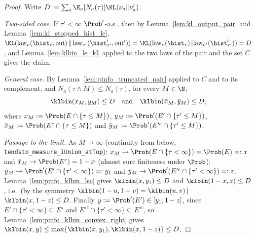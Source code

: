 \begin{proof}
\leanok
Write $D := \sum_a\E_\nu[N_a(\tau)]\KL(\nu_a\|\nu'_a)$.

\emph{Two-sided case.} If $\tau' < \infty$ $\Prob'$-a.s., then by Lemma~\ref{lem:kl_output_pair}
and Lemma~\ref{lem:kl_stopped_hist_le},
$\KL(\mathrm{law}_\nu(\hist_\tau,\mathrm{out})\,\|\,\mathrm{law}_{\nu'}(\hist'_{\tau'},\mathrm{out}'))
= \KL(\mathrm{law}_\nu(\hist_\tau)\|\mathrm{law}_{\nu'}(\hist'_{\tau'})) = D$, and
Lemma~\ref{lem:klbin_le_kl} applied to the two laws of the pair and the set $C$ gives the claim.

\emph{General case.} By Lemma~\ref{lem:pinfo_truncated_pair} applied to $C$ and to its
complement, and $N_a(\tau\wedge M) \le N_a(\tau)$, for every $M \in \N$,
\[
  \klbin(x_M, y_M) \le D \quad\text{and}\quad \klbin(\bar x_M, \bar y_M) \le D,
\]
where $x_M := \Prob(E \cap \{\tau \le M\})$, $y_M := \Prob'(E' \cap \{\tau' \le M\})$,
$\bar x_M := \Prob(E^c \cap \{\tau\le M\})$ and $\bar y_M := \Prob'(E'^c \cap \{\tau'\le M\})$.

\emph{Passage to the limit.} As $M \to \infty$ (continuity from below,
\texttt{tendsto\_measure\_iUnion\_atTop}): $x_M \to \Prob(E \cap \{\tau<\infty\}) = \Prob(E) =: x$
and $\bar x_M \to \Prob(E^c) = 1 - x$ (almost sure finiteness under $\Prob$);
$y_M \to \Prob'(E' \cap \{\tau'<\infty\}) =: y_1$ and
$\bar y_M \to \Prob'(E'^c \cap \{\tau'<\infty\}) =: z$. Lemma~\ref{lem:pinfo_klbin_lsc} gives
$\klbin(x, y_1) \le D$ and $\klbin(1 - x, z) \le D$, i.e.\ (by the symmetry
$\klbin(1-u, 1-v) = \klbin(u, v)$) $\klbin(x, 1 - z) \le D$. Finally
$y := \Prob'(E') \in [y_1, 1 - z]$, since $E' \cap \{\tau' < \infty\} \subseteq E'$ and
$E'^c \cap \{\tau' < \infty\} \subseteq E'^c$, so Lemma~\ref{lem:pinfo_klbin_convex_right} gives
$\klbin(x, y) \le \max\{\klbin(x,y_1), \klbin(x, 1 - z)\} \le D$.
\end{proof}

